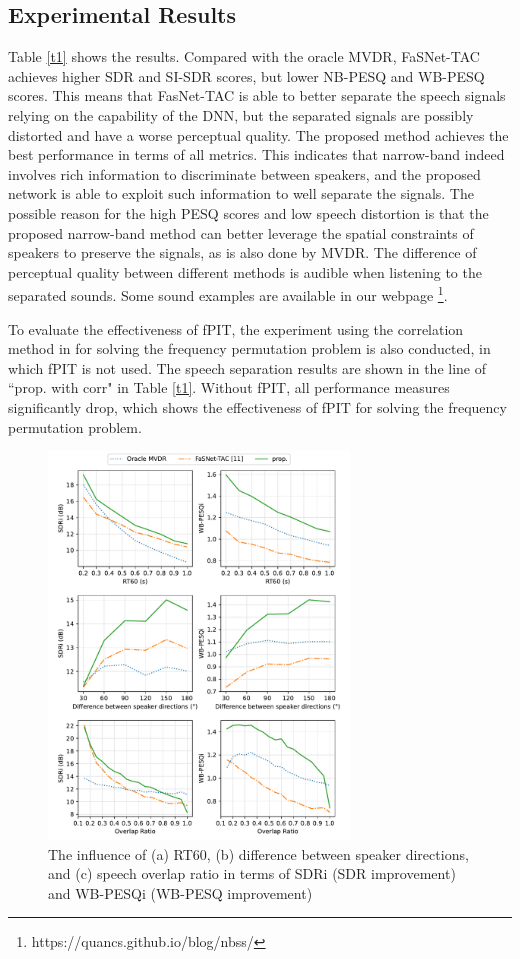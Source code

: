 \documentclass{article}
\begin{document}
\subsection{Experimental Results}
\label{ssec:rd}

Table \ref{t1} shows the results. 
Compared with the oracle MVDR, FaSNet-TAC achieves higher SDR and SI-SDR scores, but lower NB-PESQ and WB-PESQ scores.
This means that FasNet-TAC is able to better separate the speech signals relying on the capability of the DNN, but the separated signals are possibly distorted and have a worse perceptual quality.
The proposed method achieves the best performance in terms of all metrics.
This indicates that narrow-band indeed involves rich information to discriminate between speakers, and the proposed network is able to exploit such information to well separate the signals.
The possible reason for the high PESQ scores and low speech distortion is that the proposed narrow-band method can better leverage the spatial constraints of speakers to preserve the signals, as is also done by MVDR.
The difference of perceptual quality between different methods is audible when listening to the separated sounds.
Some sound examples are available in our webpage \footnote{https://quancs.github.io/blog/nbss/}.

To evaluate the effectiveness of fPIT, the experiment using the correlation method
in \cite{sawada_robust_2004} for solving the frequency permutation problem is also conducted, in which fPIT is not used.
The speech separation results are shown in the line of “prop. with corr" in Table \ref{t1}.
Without fPIT, all performance measures significantly drop, which shows the effectiveness of fPIT for solving the frequency permutation problem.

\begin{figure}[t!]
    \centering
    \includegraphics[width=8cm]{all-in-one.pdf}
    \vspace*{-3mm}
    \caption{The influence of (a) RT60, (b) difference between speaker directions, and (c) speech overlap ratio in terms of SDRi (SDR improvement) and WB-PESQi (WB-PESQ improvement)}
    \label{fig2}
\end{figure}
\end{document}

